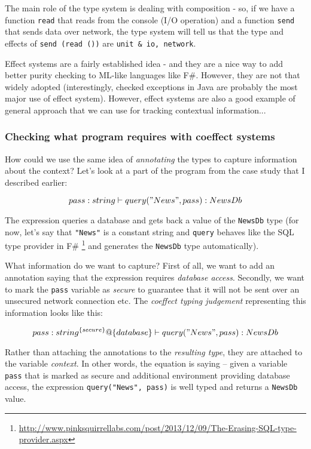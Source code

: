 The main role of the type system is dealing with composition - so, if we have a function \texttt{read} that
reads from the console (I/O operation) and a function \texttt{send} that sends data over network, the type
system will tell us that the type and effects of \texttt{send (read ())} are \texttt{unit \& {io, network}}.

Effect systems are a fairly established idea - and they are a nice way to add better purity checking
to ML-like languages like F\#. However, they are not that widely adopted (interestingly, checked
exceptions in Java are probably the most major use of effect system). However, effect systems are
also a good example of general approach that we can use for tracking contextual information...

\subsubsection{Checking what program requires with coeffect systems}

How could we use the same idea of \emph{annotating} the types to capture information about the context?
Let's look at a part of the program from the case study that I described earlier:

\begin{equation}
pass : string \vdash query("News", pass) : NewsDb
\end{equation}

The expression queries a database and gets back a value of the \texttt{NewsDb} type (for now, let's say
that \texttt{"News"} is a constant string and \texttt{query} behaves like the SQL type provider in F\# \footnote{\url{http://www.pinksquirrellabs.com/post/2013/12/09/The-Erasing-SQL-type-provider.aspx}}
and generates the \texttt{NewsDb} type automatically).

What information do we want to capture? First of all, we want to add an annotation saying that
the expression requires \emph{database access}. Secondly, we want to mark the \texttt{pass} variable as 
\emph{secure} to guarantee that it will not be sent over an unsecured network connection etc.
The \emph{coeffect typing judgement} representing this information looks like this:

\begin{equation}
pass : string^{\{secure\}} @ \{database\} \vdash query("News", pass) : NewsDb
\end{equation}

Rather than attaching the annotations to the \emph{resulting type}, they are attached to the 
variable \emph{context}. In other words, the equation is saying -- given a variable \texttt{pass} that is
marked as secure and additional environment providing database access, the expression
\texttt{query("News", pass)} is well typed and returns a \texttt{NewsDb} value.

